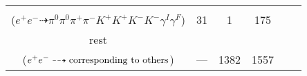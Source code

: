 \documentclass[landscape]{article}
\newcounter{rownumbers}
\newcommand\rn{\stepcounter{rownumbers}\arabic{rownumbers}}
\newcommand{\EOL}{\\} %
\newcommand{\topoTags}[1]{#1} %
\begin{document}
\begin{longtable}{clcccc}
\rn & \makecell[l]{ $ 
e^{+} e^{-} \rightarrow K^{+} K^{+} K^{-} K^{*-} \phi \gamma^{I} ,
K^{*-} \rightarrow \pi^{0} K^{-} ,
\phi \rightarrow \pi^{-} \rho^{+} ,
\rho^{+} \rightarrow \pi^{0} \pi^{+} \gamma^{F} 
$ \\ ($
e^{+} e^{-} \dashrightarrow \pi^{0} \pi^{0} \pi^{+} \pi^{-} K^{+} K^{+} K^{-} K^{-} \gamma^{I} \gamma^{F} 
$) } & \topoTags{31 & }1 & 175 \EOL

rest & \makecell[l]{ $ 
e^{+} e^{-} \rightarrow \rm{others \  (1382 \  in \  total)}
$ \\ ($
e^{+} e^{-} \dashrightarrow \rm{corresponding\ to\ others}
$) } & \topoTags{--- & }1382 & 1557 \\ \hline

\end{longtable}
\end{document}
